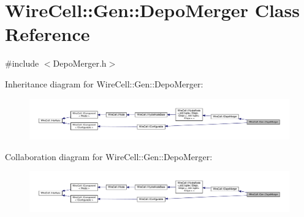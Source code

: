\hypertarget{class_wire_cell_1_1_gen_1_1_depo_merger}{}\section{Wire\+Cell\+:\+:Gen\+:\+:Depo\+Merger Class Reference}
\label{class_wire_cell_1_1_gen_1_1_depo_merger}


{\ttfamily \#include $<$Depo\+Merger.\+h$>$}



Inheritance diagram for Wire\+Cell\+:\+:Gen\+:\+:Depo\+Merger\+:
\nopagebreak
\begin{figure}[H]
\begin{center}
\leavevmode
\includegraphics[width=350pt]{class_wire_cell_1_1_gen_1_1_depo_merger__inherit__graph}
\end{center}
\end{figure}


Collaboration diagram for Wire\+Cell\+:\+:Gen\+:\+:Depo\+Merger\+:
\nopagebreak
\begin{figure}[H]
\begin{center}
\leavevmode
\includegraphics[width=350pt]{class_wire_cell_1_1_gen_1_1_depo_merger__coll__graph}
\end{center}
\end{figure}

